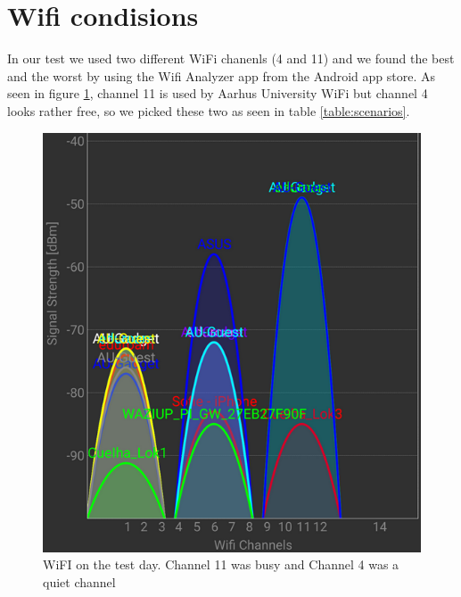 \section{Wifi condisions}\label{sc:wifi}
In our test we used two different WiFi chanenls (4 and 11) and we found the best and the worst by using the Wifi Analyzer app from the Android app store\cite{Farproc@gmail.com2018}. As seen in figure \ref{fig:wifionthetestday}, channel 11 is used by Aarhus University WiFi but channel 4 looks rather free, so we picked these two as seen in table \ref{table:scenarios}.

\begin{figure}[H]
	\centering
	\includegraphics[width=0.6\linewidth]{testAndPerformance/wifi/wifiOnTheTestDay}
	\caption{WiFI on the test day. Channel 11 was busy and Channel 4 was a quiet channel}
	\label{fig:wifionthetestday}
\end{figure}
